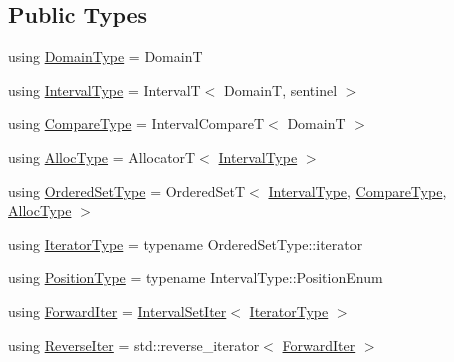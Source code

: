 \subsection*{Public Types}
\begin{DoxyCompactItemize}
\item 
using \hyperlink{structvt_1_1term_1_1interval_1_1_integral_set_base_a74b3ffb0498e75459e23d59b2d4facfa}{Domain\+Type} = DomainT
\item 
using \hyperlink{structvt_1_1term_1_1interval_1_1_integral_set_base_a1f8f5bb84064be35bbaaf15bb5a43f14}{Interval\+Type} = IntervalT$<$ DomainT, sentinel $>$
\item 
using \hyperlink{structvt_1_1term_1_1interval_1_1_integral_set_base_a8788c1d68e2b4348c341c120363c95e7}{Compare\+Type} = Interval\+CompareT$<$ DomainT $>$
\item 
using \hyperlink{structvt_1_1term_1_1interval_1_1_integral_set_base_af699b4961903ebe28d478088eae9b60a}{Alloc\+Type} = AllocatorT$<$ \hyperlink{structvt_1_1term_1_1interval_1_1_integral_set_base_a1f8f5bb84064be35bbaaf15bb5a43f14}{Interval\+Type} $>$
\item 
using \hyperlink{structvt_1_1term_1_1interval_1_1_integral_set_base_af29bc3750493c7de4043f43ef7eb2ca2}{Ordered\+Set\+Type} = Ordered\+SetT$<$ \hyperlink{structvt_1_1term_1_1interval_1_1_integral_set_base_a1f8f5bb84064be35bbaaf15bb5a43f14}{Interval\+Type}, \hyperlink{structvt_1_1term_1_1interval_1_1_integral_set_base_a8788c1d68e2b4348c341c120363c95e7}{Compare\+Type}, \hyperlink{structvt_1_1term_1_1interval_1_1_integral_set_base_af699b4961903ebe28d478088eae9b60a}{Alloc\+Type} $>$
\item 
using \hyperlink{structvt_1_1term_1_1interval_1_1_integral_set_base_a111b2ec1ea960a40ba4270be702f11f1}{Iterator\+Type} = typename Ordered\+Set\+Type\+::iterator
\item 
using \hyperlink{structvt_1_1term_1_1interval_1_1_integral_set_base_a04700201180ff07417358d70c9ac5c82}{Position\+Type} = typename Interval\+Type\+::\+Position\+Enum
\item 
using \hyperlink{structvt_1_1term_1_1interval_1_1_integral_set_base_abd0d7f40a96384d2db0a2782a8921a34}{Forward\+Iter} = \hyperlink{structvt_1_1term_1_1interval_1_1_integral_set_base_1_1_interval_set_iter}{Interval\+Set\+Iter}$<$ \hyperlink{structvt_1_1term_1_1interval_1_1_integral_set_base_a111b2ec1ea960a40ba4270be702f11f1}{Iterator\+Type} $>$
\item 
using \hyperlink{structvt_1_1term_1_1interval_1_1_integral_set_base_af36c82de08ca3e67714c9051d9f3db92}{Reverse\+Iter} = std\+::reverse\+\_\+iterator$<$ \hyperlink{structvt_1_1term_1_1interval_1_1_integral_set_base_abd0d7f40a96384d2db0a2782a8921a34}{Forward\+Iter} $>$
\end{DoxyCompactItemize}
